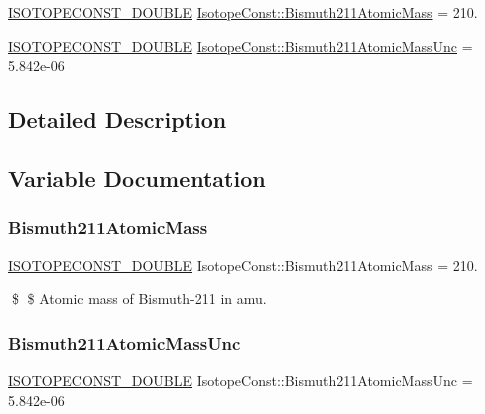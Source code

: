 \begin{DoxyCompactItemize}
\item 
\mbox{\hyperlink{group___isotope_const-_macros_ga8f45a7272ce02c0b4c65c44636ed719a}{I\+S\+O\+T\+O\+P\+E\+C\+O\+N\+S\+T\+\_\+\+D\+O\+U\+B\+LE}} \mbox{\hyperlink{group___isotope_const-_bismuth-_bi211_gabf669b834b5b70ef184dde08c1fc3f30}{Isotope\+Const\+::\+Bismuth211\+Atomic\+Mass}} = 210.
\item 
\mbox{\hyperlink{group___isotope_const-_macros_ga8f45a7272ce02c0b4c65c44636ed719a}{I\+S\+O\+T\+O\+P\+E\+C\+O\+N\+S\+T\+\_\+\+D\+O\+U\+B\+LE}} \mbox{\hyperlink{group___isotope_const-_bismuth-_bi211_gad8be97b7cde5e60c2bd3b8e00e140ef9}{Isotope\+Const\+::\+Bismuth211\+Atomic\+Mass\+Unc}} = 5.\+842e-\/06
\end{DoxyCompactItemize}


\subsection{Detailed Description}


\subsection{Variable Documentation}
\mbox{\label{group___isotope_const-_bismuth-_bi211_gabf669b834b5b70ef184dde08c1fc3f30}} 
\subsubsection{\texorpdfstring{Bismuth211\+Atomic\+Mass}{Bismuth211AtomicMass}}
{\footnotesize\ttfamily \mbox{\hyperlink{group___isotope_const-_macros_ga8f45a7272ce02c0b4c65c44636ed719a}{I\+S\+O\+T\+O\+P\+E\+C\+O\+N\+S\+T\+\_\+\+D\+O\+U\+B\+LE}} Isotope\+Const\+::\+Bismuth211\+Atomic\+Mass = 210.}

\$ \$ Atomic mass of Bismuth-\/211 in amu. \mbox{\label{group___isotope_const-_bismuth-_bi211_gad8be97b7cde5e60c2bd3b8e00e140ef9}} 
\subsubsection{\texorpdfstring{Bismuth211\+Atomic\+Mass\+Unc}{Bismuth211AtomicMassUnc}}
{\footnotesize\ttfamily \mbox{\hyperlink{group___isotope_const-_macros_ga8f45a7272ce02c0b4c65c44636ed719a}{I\+S\+O\+T\+O\+P\+E\+C\+O\+N\+S\+T\+\_\+\+D\+O\+U\+B\+LE}} Isotope\+Const\+::\+Bismuth211\+Atomic\+Mass\+Unc = 5.\+842e-\/06}


